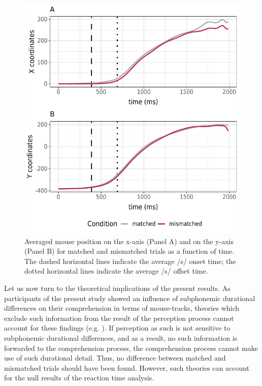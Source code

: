 \begin{figure}
    \centering
    \includegraphics[]{figures/fig7.12.pdf}
    \caption{Averaged mouse position on the x-axis (Panel A) and on the y-axis (Panel B) for matched and mismatched trials as a function of time. The dashed horizontal lines indicate the average /s/ onset time; the dotted horizontal lines indicate the average /s/ offset time.}
    \label{fig:7_12}
\end{figure}

Let us now turn to the theoretical implications of the present results. As participants of the present study showed an influence of subphonemic durational differences on their comprehension in terms of mouse-tracks, theories which exclude such information from the result of the perception process cannot account for these findings (e.g. \cite{Klatt1979, McClelland1986, Norris1994, Norris2008}). If perception as such is not sensitive to subphonemic durational differences, and as a result, no such information is forwarded to the comprehension process, the comprehension process cannot make use of such durational detail. Thus, no difference between matched and mismatched trials should have been found. However, such theories can account for the null results of the reaction time analysis.

